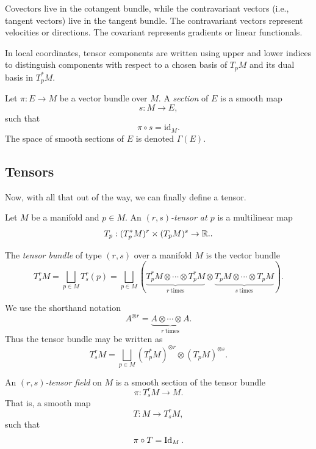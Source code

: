 \begin{note}
  Covectors live in the cotangent bundle, while the contravariant vectors (i.e., tangent vectors) live in the tangent bundle. The contravariant vectors represent velocities or directions. The covariant represents gradients or linear functionals.
\end{note}

In local coordinates, tensor components are written using upper and lower indices to distinguish components with respect to a chosen basis of $T_pM$ and its dual basis in $T_p^*M$.

\begin{definition}
  Let $\pi : E \to M$ be a vector bundle over $M$. A \emph{section} of $E$ is a smooth map
  \[%
    s : M \to E
  ,\]%
  such that
  \[%
    \pi \circ s = \mathrm{id}_M
  .\]%
  The space of smooth sections of $E$ is denoted $\Gamma(E)$.
\end{definition}

\subsection{Tensors} Now, with all that out of the way, we can finally define a tensor.

\begin{definition}
  Let $M$ be a manifold and $p \in M$. An \emph{$(r,s)$-tensor at $p$} is a multilinear map
  \[%
    T_p : (T_p^*M)^r \times (T_pM)^s \to \R.
  .\]%
\end{definition}

\begin{definition}
  The \emph{tensor bundle} of type $(r,s)$ over a manifold $M$ is the vector bundle
  \[%
    T^r_s M = \bigsqcup_{p \in M} T^r_s(p) = \bigsqcup_{p \in M} \left(\underbrace{T_p^*M \otimes \cdots \otimes T_p^*M}_{r~\text{times}} \otimes \underbrace{T_pM \otimes \cdots \otimes T_pM}_{s~\text{times}}\right)
  .\]%
\end{definition}

\begin{note}
  We use the shorthand notation
  \[%
    A^{\otimes r} = \underbrace{A \otimes \cdots \otimes A}_{r~\text{times}}
  .\]%
  Thus the tensor bundle may be written as
  \[%
    T^r_s M = \bigsqcup_{p \in M} (T_p^*M)^{\otimes r} \otimes (T_pM)^{\otimes s}
  .\]%
\end{note}

\begin{definition}
  An \emph{$(r,s)$-tensor field} on $M$ is a smooth section of the tensor bundle
  \[%
    \pi : T^r_s M \to M
  .\]%
  That is, a smooth map
  \[%
    T : M \to T^r_s M
  ,\]%
  such that
  \[%
    \pi \circ T = \Id_M
  .\]%
\end{definition}

